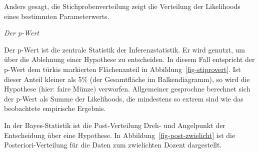 \documentclass[
  a4paper,
  DIV=11]{scrreprt}
\theoremstyle{definition}
\theoremstyle{remark}
\begin{document}
Anders gesagt, die Stichprobenverteilung zeigt die Verteilung der
Likelihoods eines bestimmten Parameterwerts.

\begin{tcolorbox}[enhanced jigsaw, leftrule=.75mm, toptitle=1mm, bottomtitle=1mm, titlerule=0mm, breakable, colframe=quarto-callout-note-color-frame, title=\textcolor{quarto-callout-note-color}{\faInfo}\hspace{0.5em}{Hinweis}, rightrule=.15mm, colback=white, arc=.35mm, left=2mm, bottomrule=.15mm, coltitle=black, opacitybacktitle=0.6, toprule=.15mm, colbacktitle=quarto-callout-note-color!10!white, opacityback=0]
\emph{Der p-Wert}

Der p-Wert ist die zentrale Statistik der Inferenzstatistik. Er wird
genutzt, um über die Ablehnung einer Hypothese zu entscheiden. In diesem
Fall entspricht der p-Wert dem türkis markierten Flächenanteil in
Abbildung~\ref{fig-stiprovert}. Ist dieser Anteil kleiner als 5\% (der
Gesamtfläche im Balkendiagramm), so wird die Hypothese (hier: faire
Münze) verworfen. Allgemeiner gesprochne berechnet sich der p-Wert als
Summe der Likelihoods, die mindestens so extrem sind wie das beobachtete
empirische Ergebnis.
\end{tcolorbox}

In der Bayes-Statistik ist die Post-Verteilung Dreh- und Angelpunkt der
Entscheidung über eine Hypothese. In Abbildung~\ref{fig-post-zwielicht}
ist die Posteriori-Verteilung für die Daten zum zwielichten Dozent
dargestellt.
\end{document}
